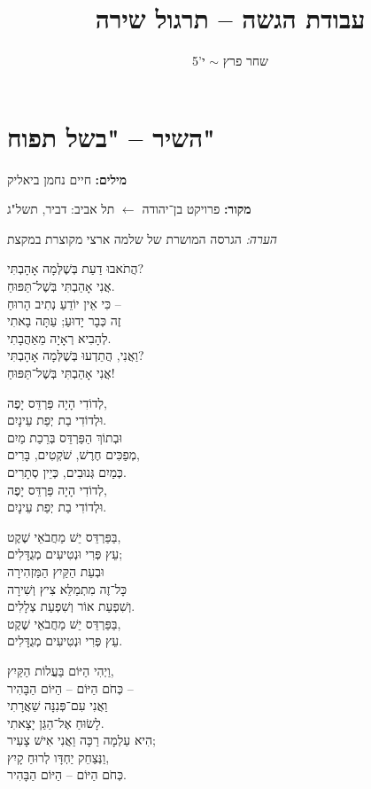 \documentclass[]{article}
\author{שחר פרץ $\sim$ י'5}
\title{עבודת הגשה – תרגול שירה}
\begin{document}
	\maketitle
	\section*{השיר – "בשל תפוח"}
	\textbf{מילים: }חיים נחמן ביאליק
	
	\textbf{מקור: }פרויקט בן־יהודה $\leftarrow$ תל אביב: דביר, תשל"ג 
	
	\textit{הערה: }הגרסה המושרת של שלמה ארצי מקוצרת במקצת
	\begin{multicols}{3}
		\begin{displayquote}
			הֲתֹאבוּ דַעַת בְּשֶׁלְּמָה אָהָבְתִּי? \\
			אֲנִי אָהַבְתִּי בְּשֶׁל־תַּפּוּחַ. \\
			כִּי אֵין יוֹדֵעַ נְתִיב הָרוּחַ – \\
			זֶה כְּבָר יָדוּעַ; עַתָּה בָאתִי \\
			לְהָבִיא רְאָיָה מֵאַהֲבָתִי. \\
			וַאֲנִי, הֲתֵדְעוּ בְּשֶׁלְּמָה אָהָבְתִּי? \\
			אֲנִי אָהַבְתִּי בְּשֶׁל־תַּפּוּחַ!
			
			לְדוֹדִי הָיָה פַּרְדֵּס יָפֶה, \\
			וּלְדוֹדִי בַת יְפַת עֵינָיִם. \\
			וּבְתוֹךְ הַפַּרְדֵּס בְּרֵכַת מַיִם \\
			מְפַכִּים חֶרֶשׁ, שֹׁקְטִים, בָּרִים, \\
			כְּמַיִם גְּנוּבִים, כְּיֵין סְתָרִים. \\
			לְדוֹדִי הָיָה פַּרְדֵּס יָפֶה, \\
			וּלְדוֹדִי בַת יְפַת עֵינָיִם.
			
			בַּפַּרְדֵּס יֵשׁ מַחֲבֹאֵי שֶׁקֶט, \\
			עֵץ פְּרִי וּנְטִיעִים מְגֻדָּלִים; \\
			וּבְעֵת הַקַּיִץ הַמַּזְהִירָה \\
			כָּל־זֶה מִתְמַלֵּא צִיץ וְשִׁירָה \\
			וְשִׁפְעַת אוֹר וְשִׁפְעַת צְלָלִים. \\
			בַּפַּרְדֵּס יֵשׁ מַחֲבֹאֵי שֶׁקֶט, \\
			עֵץ פְּרִי וּנְטִיעִים מְגֻדָּלִים.
			
			וַיְהִי הַיּוֹם בַּעֲלוֹת הַקַּיִץ, \\
			כְּחֹם הַיּוֹם – הַיּוֹם הַבָּהִיר – \\
			וַאֲנִי עִם־פְּנִנָּה שַׁאֲרָתִי \\
			לָשׂוּחַ אֶל־הַגַּן יָצָאתִי. \\
			הִיא עַלְמָה רַכָּה וַאֲנִי אִישׁ צָעִיר; \\
			וַנְּצַחֵק יַחְדָּו לְרוּחַ קָיִץ, \\
			כְּחֹם הַיּוֹם – הַיּוֹם הַבָּהִיר. 
			

\end{displayquote}
\end{multicols}
\end{document}
